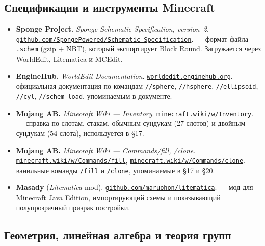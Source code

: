 \documentclass[12pt,a4paper]{scrartcl}
\newcommand{\code}[1]{\texttt{\small #1}}
\newcommand{\cmd}[1]{\textcolor{earth}{\texttt{\small #1}}}
\newcommand{\biblink}[2]{\href{#1}{\nolinkurl{#2}}}
\begin{document}
\subsection*{Спецификации и инструменты Minecraft}

\begin{itemize}[leftmargin=1.4em,itemsep=0.3em,topsep=0.3em]
  \item \textbf{Sponge Project.} \emph{Sponge Schematic Specification, version~2}.
        \biblink{https://github.com/SpongePowered/Schematic-Specification}{github.com/SpongePowered/Schematic-Specification}.
        --- формат файла \code{.schem} (gzip + NBT), который экспортирует Block Round. Загружается через WorldEdit, Litematica и MCEdit.

  \item \textbf{EngineHub.} \emph{WorldEdit Documentation}.
        \biblink{https://worldedit.enginehub.org/}{worldedit.enginehub.org}.
        --- официальная документация по командам \cmd{//sphere}, \cmd{//hsphere}, \cmd{//ellipsoid}, \cmd{//cyl}, \cmd{//schem load}, упоминаемым в документе.

  \item \textbf{Mojang AB.} \emph{Minecraft Wiki --- Inventory}.
        \biblink{https://minecraft.wiki/w/Inventory}{minecraft.wiki/w/Inventory}.
        --- справка по слотам, стакам, обычным сундукам (27 слотов) и двойным сундукам (54 слота), используется в §17.

  \item \textbf{Mojang AB.} \emph{Minecraft Wiki --- Commands/fill, /clone}.
        \biblink{https://minecraft.wiki/w/Commands/fill}{minecraft.wiki/w/Commands/fill},
        \biblink{https://minecraft.wiki/w/Commands/clone}{minecraft.wiki/w/Commands/clone}.
        --- ванильные команды \cmd{/fill} и \cmd{/clone}, упоминаемые в §17 и §20.

  \item \textbf{Masady} (\emph{Litematica} mod).
        \biblink{https://github.com/maruohon/litematica}{github.com/maruohon/litematica}.
        --- мод для Minecraft Java Edition, импортирующий схемы и показывающий полупрозрачный призрак постройки.
\end{itemize}

\subsection*{Геометрия, линейная алгебра и теория групп}
\end{document}
